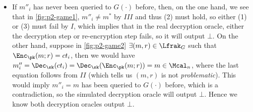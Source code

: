 \begin{answer}[i]
\begin{enumerate}
        \begin{itemize}
            \item If $m''_i$ has never been queried to $G(\cdot)$ before, then, on the one hand, we see that in \autoref{fig:p2-game1}, $m''_i\neq m^\ast$ by $III$ and thus (2) must hold, so either (1) or (3) must fail by $I$, which implies that in the real decryption oracle, either the decryption step or re-encryption step fails, so it will output $\bot$.
            On the other hand, suppose in \autoref{fig:p2-game2} $\exists (m,r)\in\Lfrak_G$ such that $\Enc_\pk(m;r)=ct_i$, then we would have $m''_i=\Dec_\sk(ct_i)=\Dec_\sk(\Enc_\pk(m;r))=m\in \Mcal_n$, where the last equation follows from $II$ (which tells us $(m,r)$ is not \textit{problematic}). This would imply $m''_i=m$ has been queried to $G(\cdot)$ before, which is a contradiction, so the simulated decryption oracle will output $\bot$. 
            Hence we know both decryption oracles output $\bot$. 


\end{itemize}
\end{enumerate}
\end{answer}
